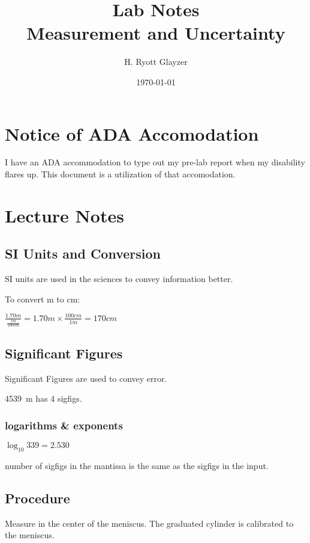 \documentclass[10pt, letterpaper]{article}
\begin{document}


\title{Lab Notes \\ \large Measurement and Uncertainty}
\author{H. Ryott Glayzer}
\date{\today}


\maketitle


\section*{Notice of ADA Accomodation}
I have an ADA accommodation to type out my pre-lab report when my disability flares up.
This document is a utilization of that accomodation.




\section{Lecture Notes}

\subsection{SI Units and Conversion}

SI units are used in the sciences to convey information better.

To convert \si{\meter} to \si{\centi\meter}:

$\frac{1.70m}{\frac{1m}{100cm}}=1.70m\times\frac{100cm}{1m}=170cm$



\subsection{Significant Figures}

Significant Figures are used to convey error.

\SI{4539}{\meter} has 4 sigfigs.


\subsubsection{logarithms \& exponents}

$\log_{10}{339} = 2.530$

number of sigfigs in the mantissa is the same as the sigfigs in the input.



\subsection{Procedure}

Measure in the center of the meniscus. 
The graduated cylinder is calibrated to the meniscus.
\end{document}
